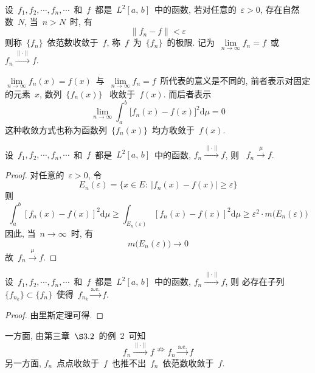 \begin{Definition}\label{Def-6-3}
设~$f_{1}, f_{2}, \cdots, f_{n}, \cdots$~和~$f$~都是~$L^{2}\left[a,\,b\right]$~中的函数, 若对任意的~$\varepsilon>0$, 存在自然数~$N$, 当~$n>N$~时, 有
\[
\|f_{n}-f\|<\varepsilon
\]
则称~$\{f_{n}\}$~依范数收敛于~$f$, 称~$f$~为~$\{f_{n}\}$~的极限. 记为~$\lim\limits_{n\rightarrow \infty}f_{n}=f$~或~$f_{n}\xrightarrow{\mathrm{\|\cdot\|}} f$.
\end{Definition}

\begin{Remark}
$\lim\limits_{n\rightarrow \infty}f_{n}(x)=f(x)$~与~$\lim\limits_{n\rightarrow \infty}f_{n}=f$~所代表的意义是不同的, 前者表示对固定的元素~$x$, 数列~$\{f_{n}(x)\}$
~收敛于~$f(x)$. 而后者表示
\[
\lim\limits_{n\rightarrow \infty}\int_{a}^{b}\big[f_n(x)-f(x) \big]^{2}\mathrm{d}\mu=0
\]
这种收敛方式也称为函数列~$\{f_{n}(x)\}$~均方收敛于~$f(x)$.
\end{Remark}

\begin{Theorem}
设~$f_{1}, f_{2}, \cdots, f_{n}, \cdots$~和~$f$~都是~$L^{2}\left[a,\,b\right]$~中的函数, $f_{n}\xrightarrow{\mathrm{\|\cdot\|}} f$, 则
~$f_n \xrightarrow{~\mu~} f$.
\end{Theorem}

\begin{proof}
对任意的~$\varepsilon>0$, 令
\[
E_n(\varepsilon) = \big\{ x \in E: \: |f_n(x) - f(x)| \geqslant \varepsilon \big\}
\]
则
\[
\int_{a}^{b}\left[f_n(x)-f(x)\right]^{2}\mathrm{d}\mu\geqslant \int_{E_n(\varepsilon)}\left[f_n(x)-f(x) \right]^{2}\mathrm{d}\mu\geqslant \varepsilon^{2}\cdot m\big(E_n(\varepsilon)\big)
\]
因此, 当~$n\rightarrow \infty$~时, 有
\[
m\big(E_n(\varepsilon)\big)\rightarrow 0
\]
故~$f_n \xrightarrow{~\mu~} f$.
\end{proof}

\begin{Theorem}
设~$f_{1}, f_{2}, \cdots, f_{n}, \cdots$~和~$f$~都是~$L^{2}\left[a,\,b\right]$~中的函数, $f_{n}\xrightarrow{\mathrm{\|\cdot\|}} f$, 则
必存在子列~$\{f_{n_k}\} \subset \{f_n\}$~使得~$f_{n_k} \xrightarrow{\mathrm{a.e.}} f$.
\end{Theorem}

\begin{proof}
由里斯定理可得.
\end{proof}

\begin{Remark}
一方面, 由第三章~$\S3.2$~的例~2~可知
\[
f_{n}\xrightarrow{\mathrm{\|\cdot\|}} f \nRightarrow f_{n}\xrightarrow{\mathrm{a.e.}} f
\]
另一方面, $f_{n}$~点点收敛于~$f$~也推不出~$f_{n}$~依范数收敛于~$f$.
\end{Remark}


